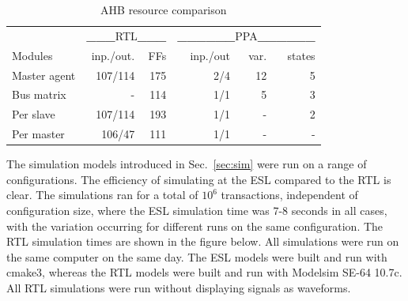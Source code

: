 \begin{table}[hbt] 
  \begin{tabular}{ l r r r r r}
  \hline 
  \hline
      & \multicolumn{2}{c}{\textbf{\_\_\_}RTL\textbf{\_\_\_}} & \multicolumn{3}{c}{\textbf{\_\_\_\_\_\_}PPA\textbf{\_\_\_\_\_\_}} \\
  Modules & inp./out. & FFs & inp./out & var. & states \\
    \hline
  Master agent & 107/114 & 175 & 2/4 & 12 & 5 \\
  \hline
  Bus matrix & - & 114 & 1/1 & 5 & 3 \\
  
  Per slave & 107/114 & 193 & 1/1 & - & 2 \\
 
  Per master & 106/47 & 111 & 1/1 & - & - \\
    \hline
    \hline  
  \end{tabular}
\caption{AHB resource comparison}
\label{tab:stats}
\end{table}

The simulation models introduced in Sec.~\ref{sec:sim} were run on a range of configurations. The efficiency of simulating at the ESL compared to the RTL is clear. The simulations ran for a total of $10^6$ transactions, independent of configuration size, where the ESL simulation time was 7-8 seconds in all cases, with the variation occurring for different runs on the same configuration. The RTL simulation times are shown in the figure below. All simulations were run on the same computer on the same day. The ESL models were built and run with cmake3, whereas the RTL models were built and run with Modelsim SE-64 10.7c. All RTL simulations were run without displaying signals as waveforms. \\

